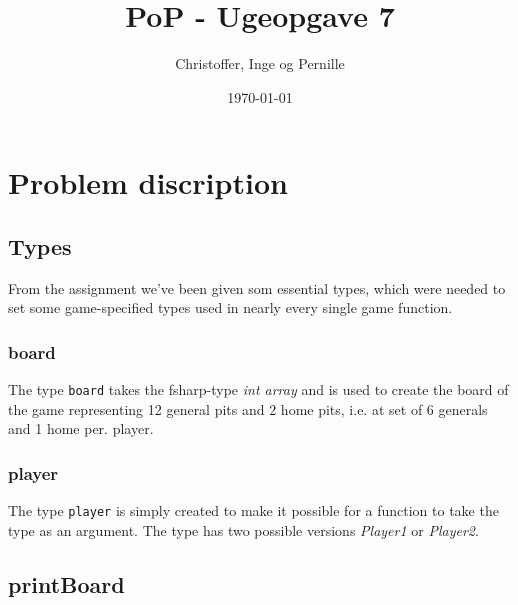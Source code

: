 \documentclass[a4paper]{report}
\title{PoP - Ugeopgave 7}
\author{Christoffer, Inge og Pernille}
\date{\today}
\begin{document}
\maketitle

\section*{Problem discription}

\subsection*{Types}
From the assignment we've been given som essential types, which were needed to set some game-specified types used in nearly every single game function.



\subsubsection*{board}
The type \texttt{board} takes the fsharp-type \textsl{int array} and is used to create the board of the game representing 12 general pits and 2 home pits, i.e. at set of 6 generals and 1 home per. player.

\subsubsection*{player}
The type \texttt{player} is simply created to make it possible for a function to take the type as an argument. The type has two possible versions \textsl{Player1} or \textsl{Player2}.


\subsection*{printBoard}



\end{document}
